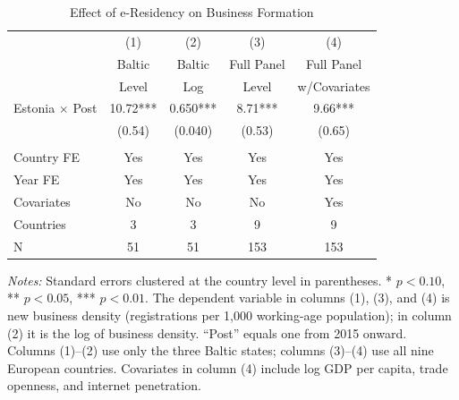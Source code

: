 \begin{table}[H]
\centering
\caption{Effect of e-Residency on Business Formation}
\label{tab:main}
\begin{threeparttable}
\begin{tabular}{lcccc}
\toprule
 & (1) & (2) & (3) & (4) \\
 & Baltic & Baltic & Full Panel & Full Panel \\
 & Level & Log & Level & w/Covariates \\
\midrule
Estonia $\times$ Post & 10.72*** & 0.650*** & 8.71*** & 9.66*** \\
 & (0.54) & (0.040) & (0.53) & (0.65) \\
\\[0.5em]
Country FE & Yes & Yes & Yes & Yes \\
Year FE & Yes & Yes & Yes & Yes \\
Covariates & No & No & No & Yes \\
Countries & 3 & 3 & 9 & 9 \\
N & 51 & 51 & 153 & 153 \\
\bottomrule
\end{tabular}
\begin{tablenotes}[flushleft]\sloppy
\footnotesize
\item \textit{Notes:} Standard errors clustered at the country level in parentheses. * $p<0.10$, ** $p<0.05$, *** $p<0.01$. The dependent variable in columns (1), (3), and (4) is new business density (registrations per 1,000 working-age population); in column (2) it is the log of business density. ``Post'' equals one from 2015 onward. Columns (1)--(2) use only the three Baltic states; columns (3)--(4) use all nine European countries. Covariates in column (4) include log GDP per capita, trade openness, and internet penetration.
\end{tablenotes}
\end{threeparttable}
\end{table}
